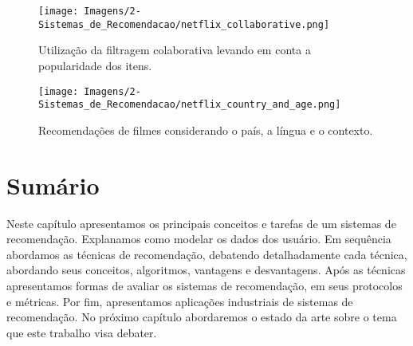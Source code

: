 \begin{figure}[hbt!]
	\centering
	\texttt{[image: Imagens/2-Sistemas\_de\_Recomendacao/netflix\_collaborative.png]}
	\caption{Utilização da filtragem colaborativa levando em conta a popularidade dos itens.}
	\label{fig:netflix_colaborative}
\end{figure}

\begin{figure}[hbt!]
	\centering
	\texttt{[image: Imagens/2-Sistemas\_de\_Recomendacao/netflix\_country\_and\_age.png]}
	\caption{Recomendações de filmes considerando o país, a língua e o contexto.}
	\label{fig:netflix_country}
\end{figure}

\section{Sumário}
Neste capítulo apresentamos os principais conceitos e tarefas de um sistemas de recomendação. Explanamos como modelar os dados dos usuário. Em sequência abordamos as técnicas de recomendação, debatendo detalhadamente cada técnica, abordando seus conceitos, algoritmos, vantagens e desvantagens. Após as técnicas apresentamos formas de avaliar os sistemas de recomendação, em seus protocolos e métricas. Por fim, apresentamos aplicações industriais de sistemas de recomendação. No próximo capítulo abordaremos o estado da arte sobre o tema que este trabalho visa debater.